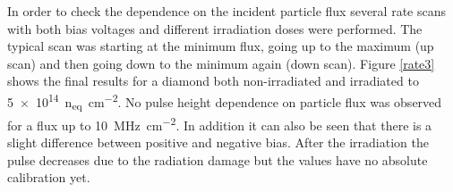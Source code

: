 
\noindent In order to check the dependence on the incident particle flux several rate scans with both bias voltages and different irradiation doses were performed. The typical scan was starting at the minimum flux, going up to the maximum (up scan) and then going down to the minimum again (down scan). Figure \vref{rate3} shows the final results for a \pcvd diamond both non-irradiated and irradiated to \SI{5e14}{n_{eq}\per \centi\meter^2}. No pulse height dependence on particle flux was observed for a flux up to \SI{10}{\mega\hertz\per cm^2}. In addition it can also be seen that there is a slight difference between positive and negative bias. After the irradiation the pulse decreases due to the radiation damage but the values have no absolute calibration yet.

